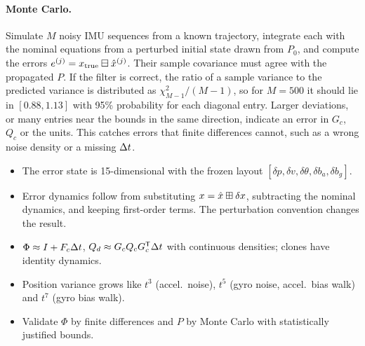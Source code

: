 \paragraph{Monte Carlo.} Simulate $M$ noisy IMU sequences from a known trajectory, integrate each with the nominal
equations from a perturbed initial state drawn from $P_0$, and compute the errors
$e^{(j)} = x_{\text{true}}\boxminus\hat x^{(j)}$. Their sample covariance must agree with the propagated $P$. If the filter is
correct, the ratio of a sample variance to the predicted variance is distributed as $\chi^2_{M-1}/(M-1)$, so for
$M = 500$ it should lie in $[0.88, 1.13]$ with 95\% probability for each diagonal entry. Larger deviations, or many
entries near the bounds in the same direction, indicate an error in $G_c$, $Q_c$ or the units. This catches errors
that finite differences cannot, such as a wrong noise density or a missing ${\Delta t}$.

\begin{takeaways}
\begin{itemize}
  \item The error state is 15-dimensional with the frozen layout $[\delta p, \delta v, \delta\theta, \delta b_a, \delta b_g]$.
  \item Error dynamics follow from substituting $x = \hat x\boxplus\delta x$, subtracting the nominal dynamics, and keeping
        first-order terms. The perturbation convention changes the result.
  \item $\Phi \approx I + F_c{\Delta t}$, $Q_d \approx G_cQ_cG_c^{\mathsf{T}}{\Delta t}$ with continuous densities; clones have identity dynamics.
  \item Position variance grows like $t^3$ (accel.\ noise), $t^5$ (gyro noise, accel.\ bias walk) and $t^7$ (gyro bias walk).
  \item Validate $\Phi$ by finite differences and $P$ by Monte Carlo with statistically justified bounds.
\end{itemize}
\end{takeaways}

